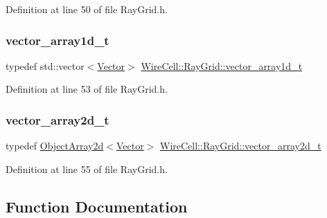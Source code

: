 Definition at line 50 of file Ray\+Grid.\+h.

\mbox{\label{namespace_wire_cell_1_1_ray_grid_a0406c6b8a3dc5f9127d665b6a2e6854a}} 
\subsubsection{\texorpdfstring{vector\+\_\+array1d\+\_\+t}{vector\_array1d\_t}}
{\footnotesize\ttfamily typedef std\+::vector$<$\hyperlink{namespace_wire_cell_aa3c82d3ba85f032b0d278b7004846800}{Vector}$>$ \hyperlink{namespace_wire_cell_1_1_ray_grid_a0406c6b8a3dc5f9127d665b6a2e6854a}{Wire\+Cell\+::\+Ray\+Grid\+::vector\+\_\+array1d\+\_\+t}}



Definition at line 53 of file Ray\+Grid.\+h.

\mbox{\label{namespace_wire_cell_1_1_ray_grid_a5fe54fc4af050aa1782db6b9761df515}} 
\subsubsection{\texorpdfstring{vector\+\_\+array2d\+\_\+t}{vector\_array2d\_t}}
{\footnotesize\ttfamily typedef \hyperlink{class_wire_cell_1_1_object_array2d}{Object\+Array2d}$<$\hyperlink{namespace_wire_cell_aa3c82d3ba85f032b0d278b7004846800}{Vector}$>$ \hyperlink{namespace_wire_cell_1_1_ray_grid_a5fe54fc4af050aa1782db6b9761df515}{Wire\+Cell\+::\+Ray\+Grid\+::vector\+\_\+array2d\+\_\+t}}



Definition at line 55 of file Ray\+Grid.\+h.



\subsection{Function Documentation}
\mbox{\label{namespace_wire_cell_1_1_ray_grid_adc5b10091f5718c87dd256f3898a2740}} 

